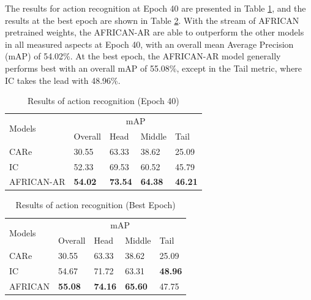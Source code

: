 The results for action recognition at Epoch 40 are presented in Table \ref{tab:allresults40}, and the results at the best epoch are shown in Table \ref{tab:allresultsbest}. With the stream of AFRICAN pretrained weights, the AFRICAN-AR are able to outperform the other models in all measured aspects at Epoch 40, with an overall mean Average Precision (mAP) of 54.02\%. At the best epoch, the AFRICAN-AR model generally performs best with an overall mAP of 55.08\%, except in the Tail metric, where IC takes the lead with 48.96\%.


\begin{table}[ht]
    \centering
    \caption{Results of action recognition (Epoch 40)}
    \label{tab:allresults40}
    \begin{tabular}{lllll}
        \toprule
        \multirow{2}{*}{Models} & \multicolumn{4}{c}{mAP} \\
        \cmidrule{2-5} 
        {} & Overall & Head  & Middle & Tail \\
        \midrule
        CARe          & 30.55   & 63.33 & 38.62 & 25.09 \\
        IC            & 52.33   & 69.53 & 60.52 & 45.79 \\        
        AFRICAN-AR    & \textbf{54.02} & \textbf{73.54} & \textbf{64.38} & \textbf{46.21} \\
        \bottomrule
    \end{tabular}
\end{table}

\begin{table}[ht]
    \centering
    \caption{Results of action recognition (Best Epoch)}
    \label{tab:allresultsbest}
    \begin{tabular}{lllll}
        \toprule
        \multirow{2}{*}{Models} & \multicolumn{4}{c}{mAP} \\
        \cmidrule{2-5} 
        {} & Overall & Head  & Middle & Tail \\
        \midrule
        CARe        & 30.55   & 63.33 & 38.62  & 25.09 \\
        IC          & 54.67   & 71.72 & 63.31 & \textbf{48.96} \\
        AFRICAN     & \textbf{55.08} & \textbf{74.16} & \textbf{65.60} & 47.75 \\
        \bottomrule
    \end{tabular}
\end{table}









